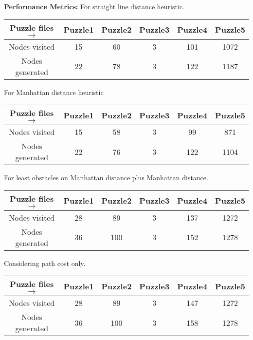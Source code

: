 \documentclass[12pt]{article}
\begin{document}
{\bf Performance Metrics:}
	\newline For straight line distance heuristic. \newline 
	\begin{tabular}{ | c | c | c | c | c | c | }
		\hline
			Puzzle files $\rightarrow$ & Puzzle1 & Puzzle2 & Puzzle3 & Puzzle4 & Puzzle5 \\ \hline
			Nodes visited &   15 & 60 & 3 & 101 & 1072 \\ \hline
			Nodes generated & 22 & 78 & 3 & 122 & 1187 \\ 
		\hline
	\end{tabular} \newline
	\newline For Manhattan distance heuristic \newline 
	\begin{tabular}{ | c | c | c | c | c | c | }
		\hline
			Puzzle files $\rightarrow$ & Puzzle1 & Puzzle2 & Puzzle3 & Puzzle4 & Puzzle5 \\ \hline
			Nodes visited &   15 & 58 & 3 & 99  & 871 \\ \hline
			Nodes generated & 22 & 76 & 3 & 122 & 1104 \\ 
		\hline
	\end{tabular} \newline
	\newline For least obstacles on Manhattan distance plus Manhattan distance. \newline
	\begin{tabular}{ | c | c | c | c | c | c | }
		\hline
			Puzzle files $\rightarrow$ & Puzzle1 & Puzzle2 & Puzzle3 & Puzzle4 & Puzzle5 \\ \hline
			Nodes visited &   28 & 89  & 3 & 137 & 1272 \\ \hline
			Nodes generated & 36 & 100 & 3 & 152 & 1278 \\
		\hline
	\end{tabular} \newline
	\newline Considering path cost only. \newline
	\begin{tabular}{ | c | c | c | c | c | c | }
		\hline
			Puzzle files $\rightarrow$ & Puzzle1 & Puzzle2 & Puzzle3 & Puzzle4 & Puzzle5 \\ \hline
			Nodes visited &   28 & 89  & 3 & 147 & 1272 \\ \hline
			Nodes generated & 36 & 100 & 3 & 158 & 1278 \\
		\hline
	\end{tabular} \newline
\end{document}
